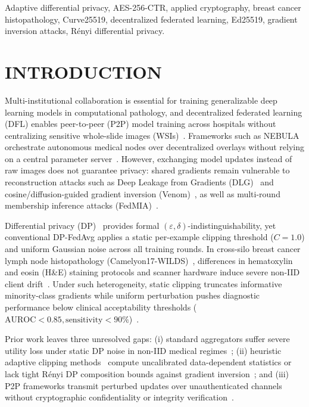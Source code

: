 \documentclass{ieeeaccess}
\begin{document}
\begin{keywords}
Adaptive differential privacy, AES-256-CTR, applied cryptography, breast cancer histopathology, Curve25519, decentralized federated learning, Ed25519, gradient inversion attacks, R\'enyi differential privacy.
\end{keywords}

\titlepgskip=-15pt
\maketitle

\section{INTRODUCTION}
Multi-institutional collaboration is essential for training generalizable deep learning models in computational pathology, and decentralized federated learning (DFL) enables peer-to-peer (P2P) model training across hospitals without centralizing sensitive whole-slide images (WSIs)~\cite{ref1}. Frameworks such as NEBULA orchestrate autonomous medical nodes over decentralized overlays without relying on a central parameter server~\cite{ref1}. However, exchanging model updates instead of raw images does not guarantee privacy: shared gradients remain vulnerable to reconstruction attacks such as Deep Leakage from Gradients (DLG)~\cite{ref2} and cosine/diffusion-guided gradient inversion (Venom)~\cite{ref3}, as well as multi-round membership inference attacks (FedMIA)~\cite{ref4}.

Differential privacy (DP)~\cite{ref5,ref6} provides formal $(\varepsilon, \delta)$-indistinguishability, yet conventional DP-FedAvg applies a static per-example clipping threshold ($C=1.0$) and uniform Gaussian noise across all training rounds. In cross-silo breast cancer lymph node histopathology (Camelyon17-WILDS)~\cite{ref7,ref8}, differences in hematoxylin and eosin (H\&E) staining protocols and scanner hardware induce severe non-IID client drift~\cite{ref9}. Under such heterogeneity, static clipping truncates informative minority-class gradients while uniform perturbation pushes diagnostic performance below clinical acceptability thresholds ($\text{AUROC} < 0.85, \text{sensitivity} < 90\%$)~\cite{ref10}.

Prior work leaves three unresolved gaps: (i) standard aggregators suffer severe utility loss under static DP noise in non-IID medical regimes~\cite{ref10,ref11}; (ii) heuristic adaptive clipping methods~\cite{ref12,ref13,ref14} compute uncalibrated data-dependent statistics or lack tight R\'enyi DP composition bounds against gradient inversion~\cite{ref15,ref16}; and (iii) P2P frameworks transmit perturbed updates over unauthenticated channels without cryptographic confidentiality or integrity verification~\cite{ref17,ref18,ref19}.
\end{document}
